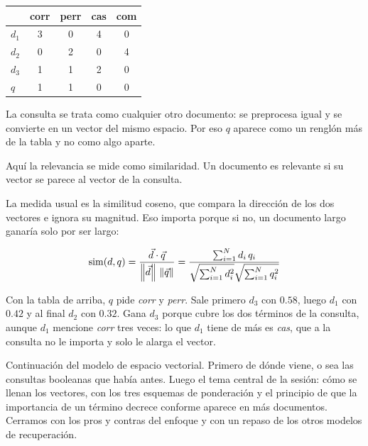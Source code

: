 \documentclass[11pt,letterpaper]{article}
\begin{document}
\begin{center}
\begin{tabular}{lcccc}
\toprule
      & \textbf{corr} & \textbf{perr} & \textbf{cas} & \textbf{com} \\
\midrule
$d_1$ & 3 & 0 & 4 & 0 \\
$d_2$ & 0 & 2 & 0 & 4 \\
$d_3$ & 1 & 1 & 2 & 0 \\
\midrule
$q$   & 1 & 1 & 0 & 0 \\
\bottomrule
\end{tabular}
\end{center}

La consulta se trata como cualquier otro documento: se preprocesa
igual y se convierte en un vector del mismo espacio. Por eso $q$
aparece como un renglón más de la tabla y no como algo aparte.

\begin{idea}
    Aquí la relevancia se mide como similaridad. Un documento es
    relevante si su vector se parece al vector de la consulta.
\end{idea}

La medida usual es la similitud coseno, que compara la dirección de
los dos vectores e ignora su magnitud. Eso importa porque si no, un
documento largo ganaría solo por ser largo:

\begin{equation}
    \mathrm{sim}(d, q) =
    \frac{\vec{d} \cdot \vec{q}}{\left\lVert \vec{d} \right\rVert \, \left\lVert \vec{q} \right\rVert}
    = \frac{\sum_{i=1}^{N} d_i \, q_i}
           {\sqrt{\sum_{i=1}^{N} d_i^2} \sqrt{\sum_{i=1}^{N} q_i^2}}
\end{equation}

Con la tabla de arriba, $q$ pide \textit{corr} y \textit{perr}. Sale
primero $d_3$ con $0.58$, luego $d_1$ con $0.42$ y al final $d_2$ con
$0.32$. Gana $d_3$ porque cubre los dos términos de la consulta,
aunque $d_1$ mencione \textit{corr} tres veces: lo que $d_1$ tiene de
más es \textit{cas}, que a la consulta no le importa y solo le alarga
el vector.

\newpage



\begin{quick_sum}
    Continuación del modelo de espacio vectorial. Primero de dónde
    viene, o sea las consultas booleanas que había antes. Luego el
    tema central de la sesión: cómo se llenan los vectores, con los
    tres esquemas de ponderación y el principio de que la importancia
    de un término decrece conforme aparece en más documentos. Cerramos
    con los pros y contras del enfoque y con un repaso de los otros
    modelos de recuperación.
\end{quick_sum}
\end{document}
